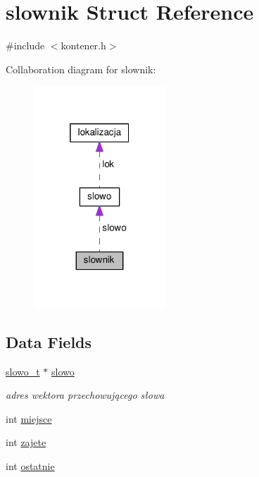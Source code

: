 \hypertarget{structslownik}{}\section{slownik Struct Reference}
\label{structslownik}


{\ttfamily \#include $<$kontener.\+h$>$}



Collaboration diagram for slownik\+:\nopagebreak
\begin{figure}[H]
\begin{center}
\leavevmode
\includegraphics[width=140pt]{structslownik__coll__graph}
\end{center}
\end{figure}
\subsection*{Data Fields}
\begin{DoxyCompactItemize}
\item 
\hyperlink{kontener_8h_aac4dfae9f3beb67b30cf6fd8ddb88731}{slowo\+\_\+t} $\ast$ \hyperlink{structslownik_a512b20a3761955c3939b569f00f93716}{slowo}
\begin{DoxyCompactList}\small\item\em adres wektora przechowującego słowa \end{DoxyCompactList}\item 
int \hyperlink{structslownik_a12ee12fe22eea3f9feb644249488cabb}{miejsce}
\item 
int \hyperlink{structslownik_ad96661a61ac1dac1419dc121cfb8d565}{zajete}
\item 
int \hyperlink{structslownik_a40c60cac651b33052c12dc30918aa840}{ostatnie}
\end{DoxyCompactItemize}


